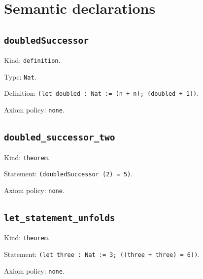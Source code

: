 \documentclass[11pt]{article}
\begin{document}
\section*{Semantic declarations}
\subsection*{\texttt{doubledSuccessor}}
\noindent Kind: \texttt{definition}.\par
\noindent Type: \texttt{Nat}.\par
\noindent Definition: \texttt{(let doubled : Nat := (n + n); (doubled + 1))}.\par
\noindent Axiom policy: \texttt{none}.\par
\subsection*{\texttt{doubled\_successor\_two}}
\noindent Kind: \texttt{theorem}.\par
\noindent Statement: \texttt{(doubledSuccessor (2) = 5)}.\par
\noindent Axiom policy: \texttt{none}.\par
\subsection*{\texttt{let\_statement\_unfolds}}
\noindent Kind: \texttt{theorem}.\par
\noindent Statement: \texttt{(let three : Nat := 3; ((three + three) = 6))}.\par
\noindent Axiom policy: \texttt{none}.\par
\end{document}
